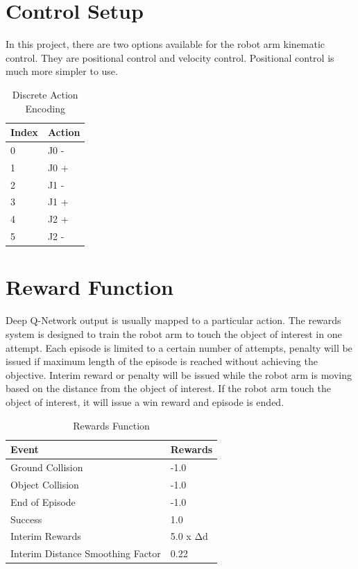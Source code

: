 \documentclass[10pt,journal,compsoc]{IEEEtran}
\begin{document}
\section{Control Setup}
In this project, there are two options available for the robot arm kinematic control. They are positional control and velocity control. Positional control is much more simpler to use.

\begin{table}[h]
\caption{Discrete Action Encoding}
\begin{tabular}{|l|l|}
\hline
\textbf{Index} & \textbf{Action} \\ \hline
0              & J0 -            \\ \hline
1              & J0 +            \\ \hline
2              & J1 -            \\ \hline
3              & J1 +            \\ \hline
4              & J2 +            \\ \hline
5              & J2 -            \\ \hline
\end{tabular}
\end{table}

\section{Reward Function}
Deep Q-Network output is usually mapped to a particular action. The rewards system is designed to train the robot arm to touch the object of interest in one attempt. Each episode is limited to a certain number of attempts, penalty will be issued if maximum length of the episode is reached without achieving the objective. Interim reward or penalty will be issued while the robot arm is moving based on the distance from the object of interest. If the robot arm touch the object of interest, it will issue a win reward and episode is ended.

\begin{table}[h]
\begin{tabular}{|l|l|}
\hline
\textbf{Event}                    & \textbf{Rewards} \\ \hline
Ground Collision                  & -1.0             \\ \hline
Object Collision                  & -1.0             \\ \hline
End of Episode                    & -1.0             \\ \hline
Success                           & 1.0              \\ \hline
Interim Rewards                   & 5.0 x Δd         \\ \hline
Interim Distance Smoothing Factor & 0.22             \\ \hline
\end{tabular}
\caption{Rewards Function}
\label{tab:my-table}
\end{table}
\end{document}
